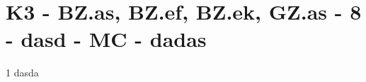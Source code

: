 \section{K3 - BZ.as, BZ.ef, BZ.ek, GZ.as - 8 - dasd - MC - dadas}

\begin{langesbeispiel}\item[1] %
dasda

\end{langesbeispiel}